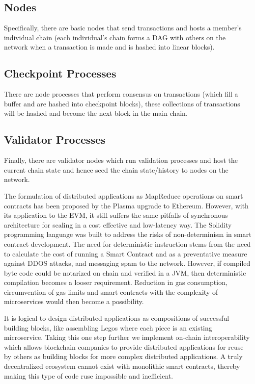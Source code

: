 \documentclass{article}
\begin{document}
\subsection{Nodes}
Specifically, there are basic nodes that send transactions and hosts a member's individual chain (each individual's chain forms a DAG with others on the network when a transaction is made and is hashed into linear blocks). 

\subsection{Checkpoint Processes}
There are node processes that perform consensus on transactions (which fill a buffer and are hashed into checkpoint blocks), these collections of transactions will be hashed and become the next block in the main chain. 

\subsection{Validator Processes}
Finally, there are validator nodes which run validation processes and host the current chain state and hence seed the chain state/history to nodes on the network. 

The formulation of distributed applications as MapReduce operations on smart contracts has been proposed by the Plasma upgrade to Ethereum. However, with its application to the EVM, it still suffers the same pitfalls of synchronous architecture for scaling in a cost effective and low-latency way. The Solidity programming language was built to address the risks of non-determinism in smart contract development. The need for deterministic instruction stems from the need to calculate the cost of running a Smart Contract and as a preventative measure against DDOS attacks, and messaging spam to the network. However, if compiled byte code could be notarized on chain and verified in a JVM, then deterministic compilation becomes a looser requirement. Reduction in gas consumption, circumvention of gas limits and smart contracts with the complexity of microservices would then become a possibility.

It is logical to design distributed applications as compositions of successful building blocks, like assembling Legos where each piece is an existing microservice. Taking this one step further we implement on-chain interoperability which allows blockchain companies to provide distributed applications for reuse by others as building blocks for more complex distributed applications. A truly decentralized ecosystem cannot exist with monolithic smart contracts, thereby making this type of code ruse impossible and inefficient. 
\end{document}
